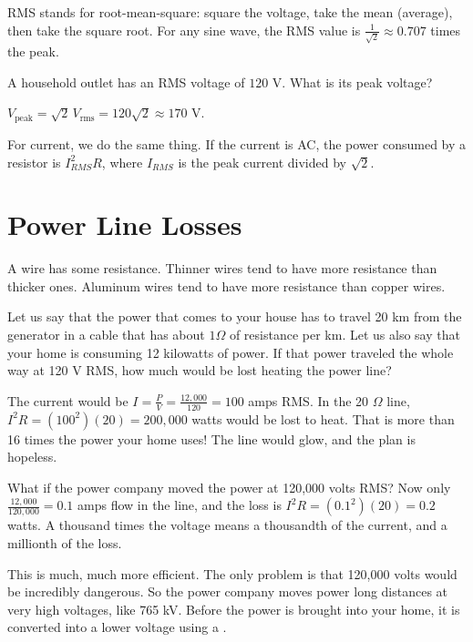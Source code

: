 RMS stands for root-mean-square: square the voltage, take the mean
(average), then take the square root. For any sine wave, the RMS value is
$\frac{1}{\sqrt{2}} \approx 0.707$ times the peak.

\begin{Worked}
\begin{Problem}
A household outlet has an RMS voltage of $120$ V.
What is its peak voltage?
\end{Problem}
\begin{Solution}
$V_{\text{peak}} = \sqrt{2}\,V_{\text{rms}} = 120\sqrt{2} \approx 170$ V.
\end{Solution}
\end{Worked}

For current, we do the same thing. If the current is AC, the power
consumed by a resistor is $I_{RMS}^2 R$, where $I_{RMS}$ is the peak
current divided by $\sqrt{2}$.

\section{Power Line Losses}

A wire has some resistance. Thinner wires tend to have more resistance
than thicker ones. Aluminum wires tend to have more resistance than
copper wires.

Let us say that the power that comes to your house has to travel 20 km
from the generator in a cable that has about $1 \Omega$ of resistance
per km.  Let us also say that your home is consuming 12 kilowatts of power. If that
power traveled the whole way at 120 V RMS, how much would be lost heating
the power line?

The current would be $I = \frac{P}{V} = \frac{12{,}000}{120} = 100$ amps
RMS. In the 20 $\Omega$ line, $I^2R = (100^2)(20) = 200{,}000$ watts would
be lost to heat. That is more than 16 times the power your home uses! The
line would glow, and the plan is hopeless.

What if the power company moved the power at 120,000 volts RMS? Now only
$\frac{12{,}000}{120{,}000} = 0.1$ amps flow in the line, and the loss is
$I^2R = (0.1^2)(20) = 0.2$ watts. A thousand times the voltage means a
thousandth of the current, and a millionth of the loss.

This is much, much more efficient. The only problem is that 120,000 volts
would be incredibly dangerous.  So the power company moves power long
distances at very high voltages, like 765 kV.  Before the power is
brought into your home, it is converted into a lower voltage using a
.

